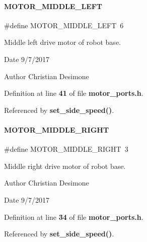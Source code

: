 \paragraph{M\+O\+T\+O\+R\+\_\+\+M\+I\+D\+D\+L\+E\+\_\+\+L\+E\+FT}
{\footnotesize\ttfamily \#define M\+O\+T\+O\+R\+\_\+\+M\+I\+D\+D\+L\+E\+\_\+\+L\+E\+FT~6}



Middle left drive motor of robot base. 

\begin{DoxyDate}{Date}
9/7/2017 
\end{DoxyDate}
\begin{DoxyAuthor}{Author}
Christian Desimone 
\end{DoxyAuthor}


Definition at line \textbf{ 41} of file \textbf{ motor\+\_\+ports.\+h}.



Referenced by \textbf{ set\+\_\+side\+\_\+speed()}.

\mbox{\label{motor__ports_8h_a0da3f792b8f28ab09b339295859d8334}} 
\paragraph{M\+O\+T\+O\+R\+\_\+\+M\+I\+D\+D\+L\+E\+\_\+\+R\+I\+G\+HT}
{\footnotesize\ttfamily \#define M\+O\+T\+O\+R\+\_\+\+M\+I\+D\+D\+L\+E\+\_\+\+R\+I\+G\+HT~3}



Middle right drive motor of robot base. 

\begin{DoxyAuthor}{Author}
Christian Desimone 
\end{DoxyAuthor}
\begin{DoxyDate}{Date}
9/7/2017 
\end{DoxyDate}


Definition at line \textbf{ 34} of file \textbf{ motor\+\_\+ports.\+h}.



Referenced by \textbf{ set\+\_\+side\+\_\+speed()}.

